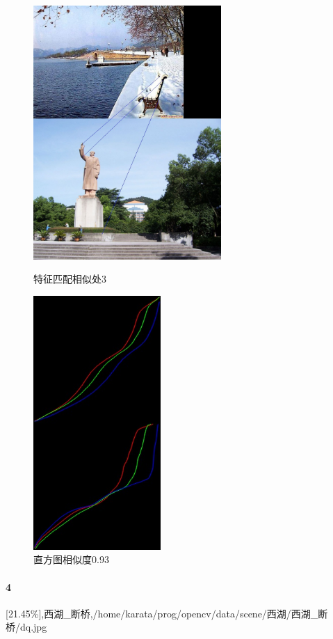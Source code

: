 \begin{figure}[htb]
\begin{minipage}[t]{0.5\linewidth}
\centering
\includegraphics[height=3.8in]{断桥.jpg.d/im3sift.jpg}
\caption{特征匹配相似处3}
\label{fig:side:a}
\end{minipage}%
\begin{minipage}[t]{0.5\linewidth}
\centering
\includegraphics[height=3.8in]{断桥.jpg.d/im3hist2.jpg}
\caption{直方图相似度0.93}
\label{fig:side:a}
\end{minipage}%
\end{figure}

\clearpage
\paragraph{4}
[21.45\%],西湖\_断桥,/home/karata/prog/opencv/data/scene/西湖/西湖\_断桥/dq.jpg

